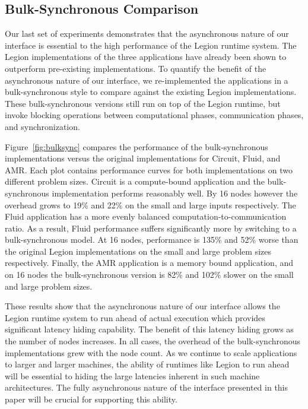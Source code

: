 

\subsection{Bulk-Synchronous Comparison}
\label{subsec:bulkcomp}

Our last set of experiments demonstrates that the asynchronous nature of our interface
is essential to the high performance of the Legion runtime system.  The Legion
implementations of the three applications have already been shown to outperform 
pre-existing implementations\cite{Legion12}.  To quantify the benefit of the asynchronous
nature of our interface, we re-implemented the applications in
a bulk-synchronous style to compare against the existing Legion implementations.  
These bulk-synchronous versions still run on top of 
the Legion runtime, but invoke blocking operations between computational phases,
communication phases, and synchronization.

Figure~\ref{fig:bulksync} compares
the performance of the bulk-synchronous implementations versus the original
implementations for Circuit, Fluid, and AMR.  Each plot contains
performance curves for both implementations on two different problem sizes.
Circuit is a compute-bound application and the bulk-synchronous implementation
performs reasonably well.  By 16 nodes however the overhead grows to 19\%
and 22\% on the small and large inputs respectively.  The Fluid application 
has a more evenly balanced computation-to-communication ratio.  As a result,
Fluid performance suffers significantly more by switching to
a bulk-synchronous model.  At 16 nodes, performance is 135\% and 52\% worse
than the original Legion implementations on the small and large problem sizes
respectively.  Finally, the AMR application is a memory bound application, and on 16 nodes
the bulk-synchronous version is 82\% and 102\% slower on the small and
large problem sizes.

These results show that the asynchronous nature of our interface allows
the Legion runtime system to run ahead of actual execution which
provides significant latency hiding capability.  
The benefit of this latency hiding grows as the number of
nodes increases. %
In all cases, the overhead of the bulk-synchronous
implementations grew with the node count.  As we continue to scale
applications to larger and larger machines, the ability of runtimes like Legion to run ahead
will be essential to hiding the large latencies inherent in such machine architectures.
The fully asynchronous nature of the interface presented in this paper
will be crucial for supporting this ability.


